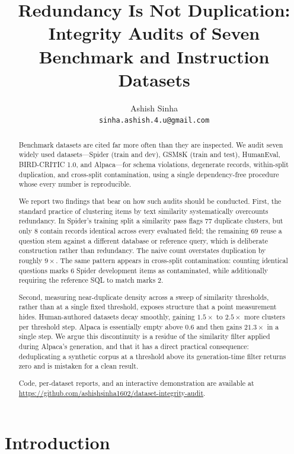 \documentclass[11pt]{article}
\title{Redundancy Is Not Duplication: Integrity Audits of Seven\\
Benchmark and Instruction Datasets}
\author{Ashish Sinha\\
\texttt{sinha.ashish.4.u@gmail.com}}
\date{}
\begin{document}
\maketitle

\begin{abstract}
Benchmark datasets are cited far more often than they are inspected. We audit
seven widely used datasets---Spider (train and dev), GSM8K (train and test),
HumanEval, BIRD-CRITIC 1.0, and Alpaca---for schema violations, degenerate
records, within-split duplication, and cross-split contamination, using a
single dependency-free procedure whose every number is reproducible.

We report two findings that bear on how such audits should be conducted. First,
the standard practice of clustering items by text similarity systematically
overcounts redundancy. In Spider's training split a similarity pass flags 77
duplicate clusters, but only 8 contain records identical across every evaluated
field; the remaining 69 reuse a question stem against a different database or
reference query, which is deliberate construction rather than redundancy. The
naive count overstates duplication by roughly $9\times$. The same pattern
appears in cross-split contamination: counting identical questions marks 6
Spider development items as contaminated, while additionally requiring the
reference SQL to match marks 2.

Second, measuring near-duplicate density across a sweep of similarity
thresholds, rather than at a single fixed threshold, exposes structure that a
point measurement hides. Human-authored datasets decay smoothly, gaining
$1.5\times$ to $2.5\times$ more clusters per threshold step. Alpaca is
essentially empty above $0.6$ and then gains $21.3\times$ in a single step. We
argue this discontinuity is a residue of the similarity filter applied during
Alpaca's generation, and that it has a direct practical consequence:
deduplicating a synthetic corpus at a threshold above its generation-time
filter returns zero and is mistaken for a clean result.

Code, per-dataset reports, and an interactive demonstration are available at
\url{https://github.com/ashishsinha1602/dataset-integrity-audit}.
\end{abstract}

\section{Introduction}
\end{document}
